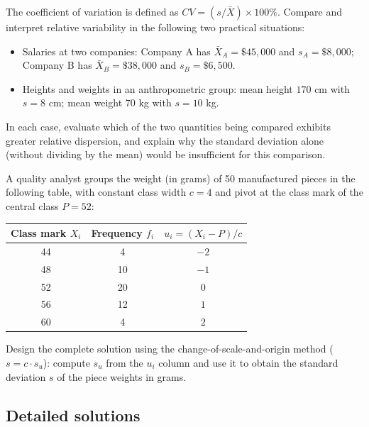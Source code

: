 \begin{problema}
	\label{prob:dd18a2e}
	The coefficient of variation is defined as $CV = (s/\bar{X}) \times 100\%$. Compare and interpret relative variability in the following two practical situations:
	\begin{itemize}
		\item Salaries at two companies: Company A has $\bar{X}_A = \$45,000$ and $s_A = \$8,000$; Company B has $\bar{X}_B = \$38,000$ and $s_B = \$6,500$.
		\item Heights and weights in an anthropometric group: mean height $170$ cm with $s = 8$ cm; mean weight $70$ kg with $s = 10$ kg.
	\end{itemize}
	In each case, evaluate which of the two quantities being compared exhibits greater relative dispersion, and explain why the standard deviation alone (without dividing by the mean) would be insufficient for this comparison.
\end{problema}

\begin{problema}
	\label{prob:78de91c}
	A quality analyst groups the weight (in grams) of 50 manufactured pieces in the following table, with constant class width $c=4$ and pivot at the class mark of the central class $P=52$:
	\begin{center}
		\begin{tabular}{ccc}
			\hline
			Class mark $X_i$ & Frequency $f_i$ & $u_i=(X_i-P)/c$ \\
			\hline
			44 & 4  & $-2$ \\
			48 & 10 & $-1$ \\
			52 & 20 & $0$ \\
			56 & 12 & $1$ \\
			60 & 4  & $2$ \\
			\hline
		\end{tabular}
	\end{center}
	Design the complete solution using the change-of-scale-and-origin method ($s = c \cdot s_u$): compute $s_u$ from the $u_i$ column and use it to obtain the standard deviation $s$ of the piece weights in grams.
\end{problema}

\subsection*{Detailed solutions}

